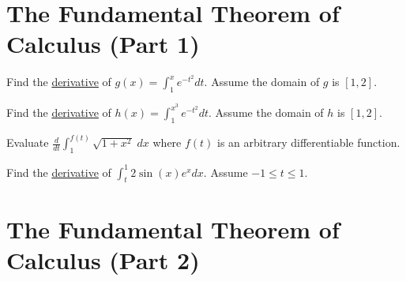 \documentclass[../main.tex]{subfiles}
\begin{document}
\clearpage

\section{The Fundamental Theorem of Calculus (Part 1)}
\begin{mdframed}[style=withref]
  \vspace{2in}

\end{mdframed}
\vspace{1.5in}

\begin{example}
  Find the \href{https://www.wolframalpha.com/input?i=differentiate+the+integral+e%5E%28-t%5E2%29+dt+from+1+to+x+with+respect+to+x}{derivative} of \(g(x) = \int_{1}^{x} e^{-t^{2}} dt\). Assume the domain of \(g\) is \([1,2]\).
\end{example}
\vspace{1.5in}

\begin{example}
  Find the \href{https://www.wolframalpha.com/input?i=differentiate+the+integral+e%5E%28-t%5E2%29+dt+from+1+to+x%5E3+with+respect+to+x}{derivative} of \(h(x) = \int_{1}^{x^{3}} e^{-t^{2}} dt\). Assume the domain of \(h\) is \([1,2]\).
\end{example}
\clearpage

\begin{example}
  Evaluate \(\frac{d}{dt} \int_{1}^{f(t)} \sqrt{1 + x^{2}} \;dx\) where \(f(t)\) is an arbitrary differentiable function.
\end{example}
\vfill

\begin{example}
  Find the \href{https://www.wolframalpha.com/input?i=differentiate+the+integral+2+sin%28x%29+e%5Ex+dx+from+t+to+1+with+respect+to+t}{derivative} of \href{https://www.wolframalpha.com/input?i=integrate+2+sin%28x%29+e%5Ex+dx+from+t+to+1}{\(\int_{t}^{1} 2 \sin(x) e^{x} dx\)}. Assume \(-1 \le t \le 1\).
\end{example}
\vfill
\clearpage



\clearpage

\section{The Fundamental Theorem of Calculus (Part 2)}
\begin{mdframed}[style=withref]
  \vspace{2in}

\end{mdframed}
\vspace{1.5in}
\end{document}
